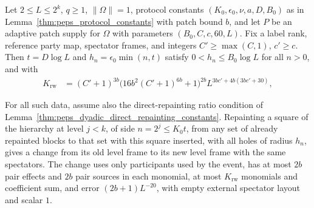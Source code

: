\begin{lemma}
    \label{thm:peps_protocol_level_events}
    \leanok
    Let $2\le L\le 2^k$, $q\ge1$, $\lVert\Omega\rVert=1$, protocol constants $(K_0,\epsilon_0,\nu,a,D,B_0)$ as in Lemma~\ref{thm:peps_protocol_constants} with patch bound $b$, and let $P$ be an adaptive patch supply for $\Omega$ with parameters $(B_0,C,c,60,L)$. Fix a label rank, reference party map, spectator frames, and integers $C'\ge\max(C,1)$, $c'\ge c$. Then $t=D\log L$ and $h_n=\epsilon_0\min(n,t)$ satisfy $0<h_n\le B_0\log L$ for all $n>0$, and with
    \begin{align}
        K_{\mathrm{rw}} & =(C'+1)^{3b}
        \bigl(16b^2(C'+1)^{6b}+1\bigr)^{2b}
        L^{3bc'+4b(3bc'+30)},
        \label{eq:peps_protocol_level_rewrite_bound}
    \end{align}

    For all such data, assume also the direct-repainting ratio condition of
    Lemma~\ref{thm:peps_dyadic_direct_repainting_constants}. Repainting a square of
    the hierarchy at level $j<k$, of side $n=2^j\le K_0t$, from any set of already
    repainted blocks to that set with this square inserted, with all holes of radius
    $h_n$, gives a change from its old level frame to its new level frame with the same
    spectators. The change uses only participants used by the event, has at most $2b$
    pair effects and $2b$ pair sources in each monomial, at most $K_{\mathrm{rw}}$
    monomials and coefficient sum, and error $(2b+1)L^{-20}$, with empty external
    spectator layout and scalar $1$.


\end{lemma}
